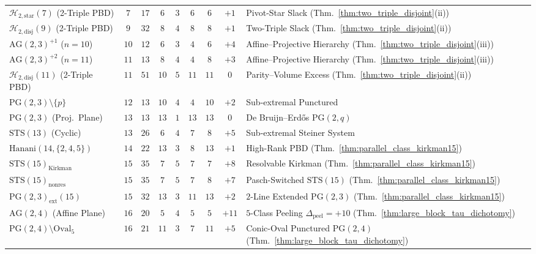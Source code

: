 \documentclass[11pt,reqno]{amsart}
\theoremstyle{definition}
\theoremstyle{remark}
\begin{document}
\begin{table}[ht]
{\begin{tabular}{lcccccccl}
    $\mathcal{H}_{2,\mathrm{star}}(7)$ (2-Triple PBD) & $7$ & $17$ & $6$ & $3$ & $6$ & $6$ & $+1$ & Pivot-Star Slack (Thm.~\ref{thm:two_triple_disjoint}(ii)) \\
    $\mathcal{H}_{2,\mathrm{disj}}(9)$ (2-Triple PBD) & $9$ & $32$ & $8$ & $4$ & $8$ & $8$ & $+1$ & Two-Triple Slack (Thm.~\ref{thm:two_triple_disjoint}(ii)) \\
    $\mathrm{AG}(2,3)^{+1}$ ($n=10$) & $10$ & $12$ & $6$ & $3$ & $4$ & $6$ & $+4$ & Affine--Projective Hierarchy (Thm.~\ref{thm:two_triple_disjoint}(iii)) \\
    $\mathrm{AG}(2,3)^{+2}$ ($n=11$) & $11$ & $13$ & $8$ & $4$ & $4$ & $8$ & $+3$ & Affine--Projective Hierarchy (Thm.~\ref{thm:two_triple_disjoint}(iii)) \\
    $\mathcal{H}_{2,\mathrm{disj}}(11)$ (2-Triple PBD) & $11$ & $51$ & $10$ & $5$ & $11$ & $11$ & $0$ & Parity--Volume Excess (Thm.~\ref{thm:two_triple_disjoint}(ii)) \\
    $\mathrm{PG}(2,3)\setminus\{p\}$ & $12$ & $13$ & $10$ & $4$ & $4$ & $10$ & $+2$ & Sub-extremal Punctured \\
    $\mathrm{PG}(2,3)$ (Proj.\ Plane) & $13$ & $13$ & $13$ & $1$ & $13$ & $13$ & $0$ & De Bruijn--Erd\H{o}s $\mathrm{PG}(2,q)$ \\
    $\mathrm{STS}(13)$ (Cyclic)  & $13$ & $26$ & $6$  & $4$ & $7$  & $8$  & $+5$ & Sub-extremal Steiner System \\
    $\mathrm{Hanani}(14,\{2,4,5\})$ & $14$ & $22$ & $13$ & $3$ & $8$ & $13$ & $+1$ & High-Rank PBD (Thm.~\ref{thm:parallel_class_kirkman15}) \\
    $\mathrm{STS}(15)_{\mathrm{Kirkman}}$ & $15$ & $35$ & $7$ & $5$ & $7$ & $7$ & $+8$ & Resolvable Kirkman (Thm.~\ref{thm:parallel_class_kirkman15}) \\
    $\mathrm{STS}(15)_{\mathrm{nonres}}$ & $15$ & $35$ & $7$ & $5$ & $7$ & $8$ & $+7$ & Pasch-Switched $\mathrm{STS}(15)$ (Thm.~\ref{thm:parallel_class_kirkman15}) \\
    $\mathrm{PG}(2,3)_{\mathrm{ext}}(15)$ & $15$ & $32$ & $13$ & $3$ & $11$ & $13$ & $+2$ & $2$-Line Extended $\mathrm{PG}(2,3)$ (Thm.~\ref{thm:parallel_class_kirkman15}) \\
    $\mathrm{AG}(2,4)$ (Affine Plane) & $16$ & $20$ & $5$ & $4$ & $5$ & $5$ & $+11$ & $5$-Class Peeling $\Delta_{\mathrm{peel}}=+10$ (Thm.~\ref{thm:large_block_tau_dichotomy}) \\
    $\mathrm{PG}(2,4)\setminus\mathrm{Oval}_5$ & $16$ & $21$ & $11$ & $3$ & $7$ & $11$ & $+5$ & Conic-Oval Punctured $\mathrm{PG}(2,4)$ (Thm.~\ref{thm:large_block_tau_dichotomy}) \\

\end{tabular}}
\end{table}
\end{document}
